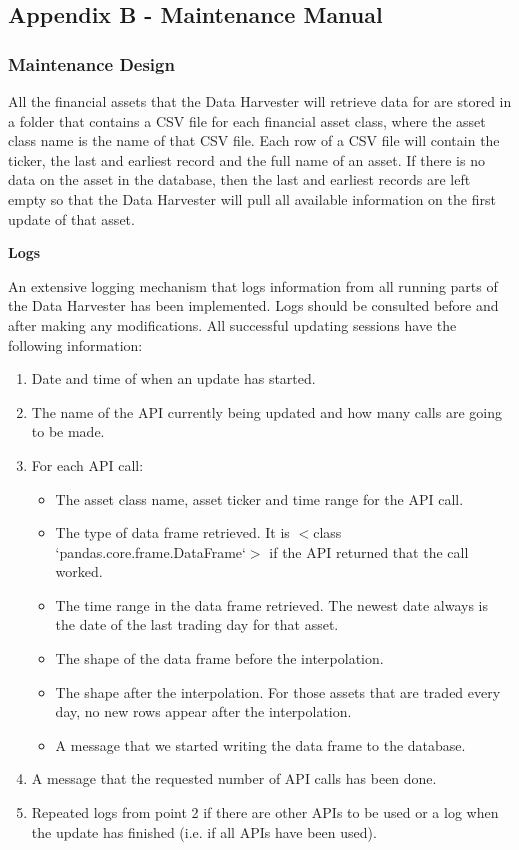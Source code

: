 \documentclass[main.tex]{subfiles}
\begin{document}
\subsection{Appendix B - Maintenance Manual}
\label{MaintenanceManual}

\subsubsection{Maintenance Design}

All the financial assets that the Data Harvester will retrieve data for are stored in a folder that contains a CSV file for each financial asset class, where the asset class name is the name of that CSV file. Each row of a CSV file will contain the ticker, the last and earliest record and the full name of an asset. If there is no data on the asset in the database, then the last and earliest records are left empty so that the Data Harvester will pull all available information on the first update of that asset.\newline

\textbf{Logs\newline}
\label{dhav_logs}

An extensive logging mechanism that logs information from all running parts of the Data Harvester has been implemented. Logs should be consulted before and after making any modifications. All successful updating sessions have the following information:

\begin{enumerate}
    \item Date and time of when an update has started.
    \item The name of the API currently being updated and how many calls are going to be made.
    \item For each API call: 
        \begin{itemize}
        \item The asset class name, asset ticker and time range for the API call.
        \item The type of data frame retrieved.  It is $<$class `pandas.core.frame.DataFrame`$>$ if the API returned that the call worked.
        \item The time range in the data frame retrieved. The newest date always is the date of the last trading day for that asset.
        \item The shape of the data frame before the interpolation.
        \item The shape after the interpolation. For those assets that are traded every day, no new rows appear after the interpolation.
        \item A message that we started writing the data frame to the database.
    \end{itemize}
    \item A message that the requested number of API calls has been done.
    \item Repeated logs from point 2 if there are other APIs to be used or a log when the update has finished (i.e. if all APIs have been used).
\end{enumerate}
\end{document}
